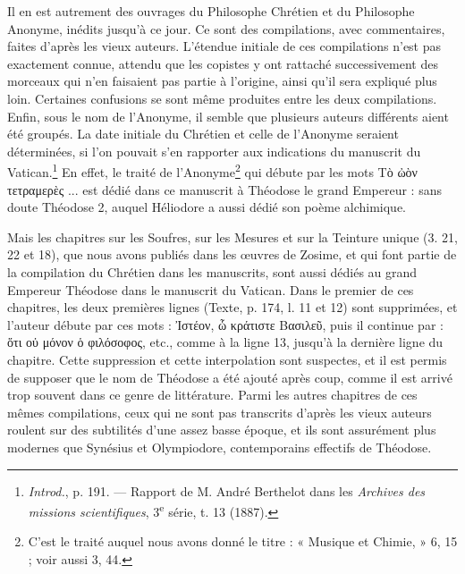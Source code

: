 \documentclass[a4paper, 11pt, oneside, polutonikogreek, french]{article}
\begin{document}
Il en est autrement des ouvrages du Philosophe Chrétien et du Philosophe Anonyme, inédits jusqu'à ce jour. Ce sont des compilations, avec commentaires, faites d'après les vieux auteurs. L'étendue initiale de ces compilations n'est pas exactement connue, attendu que les copistes y ont rattaché successivement des morceaux qui n'en faisaient pas partie à l'origine, ainsi qu'il sera expliqué plus loin. Certaines confusions se sont même produites entre les deux compilations. Enfin, sous le nom de l'Anonyme, il semble que plusieurs auteurs différents aient été groupés. La date initiale du Chrétien et celle de l'Anonyme seraient déterminées, si l'on pouvait s'en rapporter aux indications du manuscrit du Vatican.\footnote{\emph{Introd.}, p. 191. --- Rapport de M. André Berthelot dans les \emph{Archives des missions scientifiques}, 3\textsuperscript{e} série, t. 13 (1887).} En effet, le traité de l'Anonyme\footnote{C'est le traité auquel nous avons donné le titre : « Musique et Chimie, » 6, 15 ; voir aussi 3, 44.} qui débute par les mots Τὸ ὠὸν τετραμερὲς ... est dédié dans ce manuscrit à Théodose le grand Empereur : sans doute Théodose 2, auquel Héliodore a aussi dédié son poème alchimique.

Mais les chapitres sur les Soufres, sur les Mesures et sur la Teinture unique (3. 21, 22 et 18), que nous avons publiés dans les œuvres de Zosime, et qui font partie de la compilation du Chrétien dans les manuscrits, sont aussi dédiés au grand Empereur Théodose dans le manuscrit du Vatican. Dans le premier de ces chapitres, les deux premières lignes (Texte, p. 174, l. 11 et 12) sont supprimées, et l'auteur débute par ces mots : Ἰστέον, ὧ κράτιστε Βασιλεῦ, puis il continue par : ὅτι οὐ μόνον ὁ φιλόσοφος, etc., comme à la ligne 13, jusqu'à la dernière ligne du chapitre. Cette suppression et cette interpolation sont suspectes, et il est permis de supposer que le nom de Théodose a été ajouté après coup, comme il est arrivé trop souvent dans ce genre de littérature. Parmi les autres chapitres de ces mêmes compilations, ceux qui ne sont pas transcrits d'après les vieux auteurs roulent sur des subtilités d'une assez basse époque, et ils sont assurément plus modernes que Synésius et Olympiodore, contemporains effectifs de Théodose.
\end{document}
